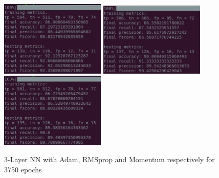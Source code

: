 \documentclass[a4paper,10pt,twoside]{article}
\begin{document}
\begin{figure}[h!]
\centering
\includegraphics[scale=1.0, width=5cm]{Fig41_Adam.png}
\includegraphics[scale=1.0, width=5cm]{Fig42_RMSprop.png}
\includegraphics[scale=1.0, width=5cm]{Fig43_SGD_momentum.png}
\caption*{3-Layer NN with Adam, RMSprop and Momentum respectively for 3750 epochs}
\end{figure}
\end{document}

